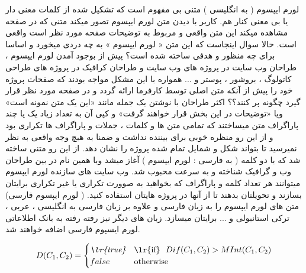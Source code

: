 لورم ایپسوم ( به انگلیسی  ) متنی بی مفهوم است که تشکیل شده از کلمات معنی دار یا بی معنی کنار هم. کاربر با دیدن متن لورم ایپسوم تصور میکند متنی که در صفحه مشاهده میکند این متن واقعی و مربوط به توضیحات صفحه مورد نظر است واقعی است. حالا سوال اینجاست که این متن « لورم ایپسوم » به چه دردی میخورد و اساسا برای چه منظور و هدفی ساخته شده است؟ پیش از بوجود آمدن لورم ایپسوم ، طراحان وب سایت در پروژه های وب سایت و طراحان کرافیک در پروژه های طراحی کاتولوگ ، بروشور ، پوستر و ... همواره با این مشکل مواجه بودند که صفحات پروژه خود را پیش از آنکه متن اصلی توسط کارفرما ارائه گردد و در صفحه مورد نظر قرار گیرد چگونه پر کنند؟؟ اکثر طراحان با نوشتن یک جمله مانند «این یک متن نمونه است» ویا «توضیحات در این بخش قرار خواهند گرفت» و کپی آن به تعداد زیاد یک یا چند پاراگراف متن میساختند که تمامی متن ها و کلمات ، جملات و پاراگراف ها تکراری بود و از این رو منظره خوبی برای بیننده نداشت و ضمنا به هیچ وجه واقعی به نظر نمیرسید تا بتواند شکل و شمایل تمام شده پروژه را نشان دهد. از این رو متنی ساخته شد که با دو کلمه ( به فارسی : لورم ایپسوم ) آغاز میشد وبا همین نام در بین طراحان وب و گرافیک شناخته و به سرعت محبوب شد. وب سایت های سازنده لورم ایپسوم میتوانند هر تعداد کلمه و پاراگراف که بخواهید به صوورت تکراری یا غیر تکراری برایتان بسازند و تحویلتان بدهند تا از آنها در پروژه هایتان استفاده کنید. ( لورم ایپسوم فارسی) متن های لورم ایپسوم را به زبان فارسی و علاوه بر زبان فارسی به انگلیسی ، عربی ، ترکی استانبولی و ... برایتان میسازد. زبان های دیگر نیز رفته رفته به بانک اطلاعاتی لورم ایسپوم فارسی اضافه خواهند شد.  


 \begin{equation}
 D(C_1, C_2) = 
 \begin{cases}
    \textit{\lr{true}} & \text{\lr{if} } \ Dif(C_1, C_2) > MInt(C_1, C_2)\\
    false & \text{otherwise}
\end{cases}
 \end{equation}
 
